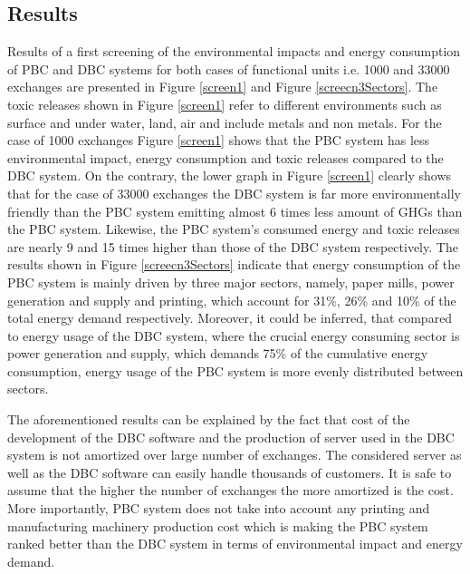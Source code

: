 \documentclass[conference]{IEEEtran}
\begin{document}
 \subsection{Results}
Results of a first screening of the environmental impacts and energy consumption of PBC and DBC systems for both cases of functional units i.e. 1000 and 33000 exchanges are presented in Figure \ref{screen1} and Figure \ref{screecn3Sectors}. The toxic releases shown in Figure \ref{screen1} refer to different environments such as surface and under water, land, air and include metals and non metals. For the case of 1000 exchanges Figure \ref{screen1} shows that the PBC system has less environmental impact, energy consumption and toxic releases compared to the DBC system. On the contrary, the lower graph in Figure \ref{screen1} clearly shows that for the case of 33000 exchanges the DBC system is far more environmentally friendly than the PBC system emitting almost 6 times less amount of GHGs than the PBC system. Likewise, the PBC system's consumed energy and toxic releases are nearly 9 and 15 times higher than those of the DBC system respectively. The results shown in Figure \ref{screecn3Sectors} indicate that energy consumption of the PBC system is mainly driven by three major sectors, namely, paper mills, power generation and supply and printing, which account for 31\%, 26\% and 10\% of the total energy demand respectively. Moreover, it could be inferred, that compared to energy usage of the DBC system, where the crucial energy consuming sector is power generation and supply, which demands 75\% of the cumulative energy consumption, energy usage of the PBC system is more evenly distributed between sectors. 

The aforementioned results can be explained by the fact that cost of the development of the DBC software and the production of server used in the DBC system is not amortized over large number of exchanges. The considered server as well as the DBC software can easily handle thousands of customers. It is safe to assume that the higher the number of exchanges the more amortized is the cost. More importantly, PBC system does not take into account any printing and manufacturing machinery production cost which is making the PBC system ranked better than the DBC system in terms of environmental impact and energy demand.
\end{document}
